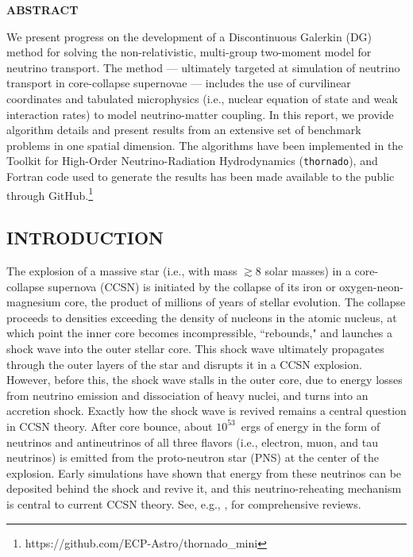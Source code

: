 \documentclass[11pt,letterpaper,twoside,english,final]{article}
\newcommand{\thornado}{\texttt{thornado}}
\begin{document}
\newpage

\clearemptydoublepage


\setcounter{page}{1}

{}
\begin{center}
{\bf{ABSTRACT}}
\end{center}

\renewcommand{\thefootnote}{\fnsymbol{footnote}}

We present progress on the development of a Discontinuous Galerkin (DG) method for solving the non-relativistic, multi-group two-moment model for neutrino transport.  
The method --- ultimately targeted at simulation of neutrino transport in core-collapse supernovae --- includes the use of curvilinear coordinates and tabulated microphysics (i.e., nuclear equation of state and weak interaction rates) to model neutrino-matter coupling.  
In this report, we provide algorithm details and present results from an extensive set of benchmark problems in one spatial dimension. 
The algorithms have been implemented in the Toolkit for High-Order Neutrino-Radiation Hydrodynamics (\thornado), and Fortran code used to generate the results has been made available to the public through GitHub.\footnote{https://github.com/ECP-Astro/thornado{\_}mini}

\begin{center}
  \section{INTRODUCTION}
\end{center}

The explosion of a massive star (i.e., with mass $\gtrsim8$ solar masses) in a core-collapse supernova (CCSN) is initiated by the collapse of its iron or oxygen-neon-magnesium core, the product of millions of years of stellar evolution. 
The collapse proceeds to densities exceeding the density of nucleons in the atomic nucleus, at which point the inner core becomes incompressible, ``rebounds," and launches a shock wave into the outer stellar core. 
This shock wave ultimately propagates through the outer layers of the star and disrupts it in a CCSN explosion. 
However, before this, the shock wave stalls in the outer core, due to energy losses from neutrino emission and dissociation of heavy nuclei, and turns into an accretion shock.  
Exactly how the shock wave is revived remains a central question in CCSN theory.  
After core bounce, about $10^{53}$~ergs of energy in the form of neutrinos and antineutrinos of all three flavors (i.e., electron, muon, and tau neutrinos) is emitted from the proto-neutron star (PNS) at the center of the explosion.  
Early simulations \citep[e.g.,][]{betheWilson_1985} have shown that energy from these neutrinos can be deposited behind the shock and revive it, and this neutrino-reheating mechanism is central to current CCSN theory.  
See, e.g., \citet{mezzacappa_2005,janka_2012,burrows_2013,muller_2016}, for comprehensive reviews.  
\end{document}
